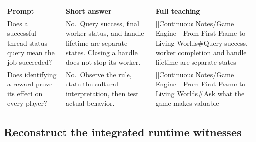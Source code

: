 \hypertarget{appendix-64ea716dcadc-context-and-lifecycle}{}

{\def\LTcaptype{none} %
\begin{longtable}[]{@{}
  >{\raggedright\arraybackslash}p{}
  >{\raggedright\arraybackslash}p{}
  >{\raggedright\arraybackslash}p{}@{}}
\toprule\noalign{}
\begin{minipage}[b]{\linewidth}\raggedright
Prompt
\end{minipage} & \begin{minipage}[b]{\linewidth}\raggedright
Short answer
\end{minipage} & \begin{minipage}[b]{\linewidth}\raggedright
Full teaching
\end{minipage} \\
\midrule\noalign{}
\endhead
\bottomrule\noalign{}
\endlastfoot
Does a successful thread-status query mean the job succeeded? & No.~Query success, final worker status, and handle lifetime are separate states. Closing a handle does not stop its worker. & {[}{[}Continuous Notes/Game Engine - From First Frame to Living Worlds\#Query success, worker completion and handle lifetime are separate states \\
Does identifying a reward prove its effect on every player? & No.~Observe the rule, state the cultural interpretation, then test actual behavior. & {[}{[}Continuous Notes/Game Engine - From First Frame to Living Worlds\#Ask what the game makes valuable \\
\end{longtable}
}

\subsection{Reconstruct the integrated runtime witnesses}\label{appendix-64ea716dcadc-reconstruct-the-integrated-runtime-witnesses}

\hypertarget{appendix-64ea716dcadc-reconstruct-the-integrated-runtime-witnesses}{}

